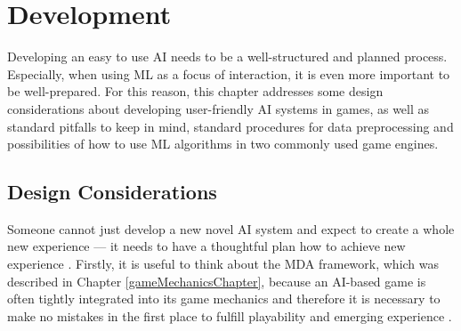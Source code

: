\documentclass[MGS,Master,english]{twbook}%
\begin{document}
\section{Development} \label{mlDevelopment}
Developing an easy to use AI needs to be a well-structured and planned process. Especially, when using ML as a focus of interaction, it is even more important to be well-prepared. For this reason, this chapter addresses some design considerations about developing user-friendly AI systems in games, as well as standard pitfalls to keep in mind, standard procedures for data preprocessing and possibilities of how to use ML algorithms in two commonly used game engines.

\subsection{Design Considerations}
Someone cannot just develop a new novel AI system and expect to create a whole new experience — it needs to have a thoughtful plan how to achieve new experience \cite{ai::gameDesign}. Firstly, it is useful to think about the MDA framework, which was described in Chapter \ref{gameMechanicsChapter}, because an AI-based game is often tightly integrated into its game mechanics and therefore it is necessary to make no mistakes in the first place to fulfill playability and emerging experience \cite{ai::gameDesign}. 
\end{document}
